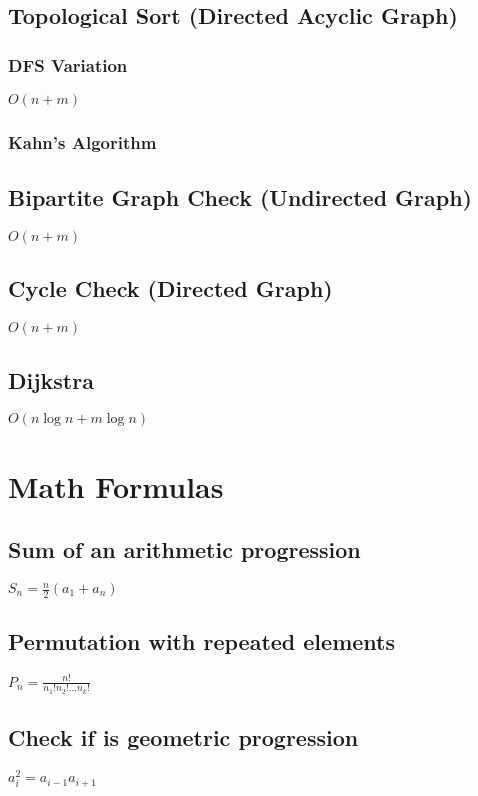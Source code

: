\documentclass{article}
\begin{document}
\subsection{Topological Sort (Directed Acyclic Graph)}
\subsubsection{DFS Variation}
$O(n+m)$


\subsubsection{Kahn's Algorithm}


\subsection{Bipartite Graph Check (Undirected Graph)}
$O(n+m)$


\subsection{Cycle Check (Directed Graph)}
$O(n+m)$


\subsection{Dijkstra}
$O(n \log n + m\log n)$


\section{Math Formulas}
\subsection{Sum of an arithmetic progression}
$S_n = \frac{n}{2}(a_1 + a_n)$

\subsection{Permutation with repeated elements}
$P_n = \frac{n!}{n_1!n_2!...n_k!}$ 

\subsection{Check if is geometric progression}
$a_i^{2} = a_{i-1}a_{i+1}$
\end{document}
